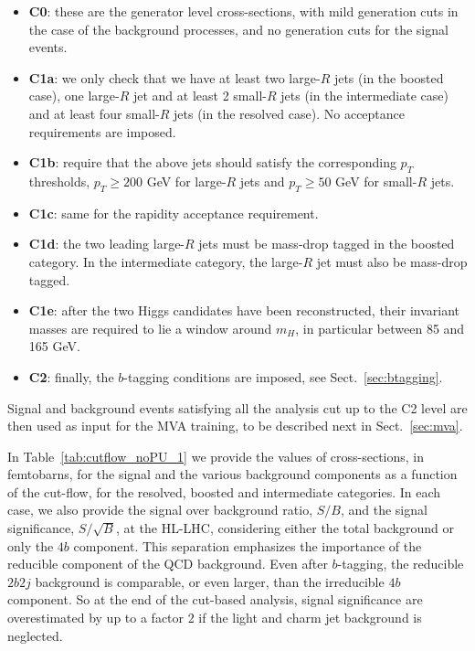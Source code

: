     \begin{itemize}
    \item {\bf C0}: these are the generator level cross-sections, with
      mild generation cuts in the case of the background processes, and no
      generation cuts
      for the signal events.
    \item {\bf C1a}:  we only check that we have at least
      two large-$R$ jets (in the boosted case),
      one large-$R$ jet and at least 2 small-$R$ jets (in the intermediate
      case) and at least four small-$R$ jets (in the resolved case).
      No acceptance requirements are imposed.
    \item {\bf C1b}: require that the above jets should
      satisfy the corresponding $p_T$ thresholds,
      $p_T \ge 200$ GeV for large-$R$ jets and
      $p_T \ge 50$ GeV for small-$R$ jets.
    \item {\bf C1c}: same for the
      rapidity acceptance requirement.
    \item {\bf C1d}: the two leading large-$R$ jets must
      be mass-drop tagged in the boosted category.
      In the intermediate category, the large-$R$ jet must also be mass-drop tagged.
    \item {\bf C1e}: after the two Higgs candidates  have been reconstructed,
      their invariant masses are required to lie a window around $m_H$,
      in particular between 85 and 165 GeV.
          \item {\bf C2}: finally, the
            $b$-tagging conditions are
            imposed, see
            Sect.~\ref{sec:btagging}.
      \end{itemize}
    Signal and background events satisfying all the analysis cut up to the
    C2 level
    are then used as input for the MVA training, to be described next
    in Sect.~\ref{sec:mva}.

    In Table~\ref{tab:cutflow_noPU_1} we provide
    the values of cross-sections, in femtobarns,
     for the signal
      and the various background
      components as a function of the
      cut-flow, for the resolved,
      boosted and intermediate
      categories.
       In each case, we also provide the signal over
      background ratio, $S/B$, and the signal
      significance, $S/\sqrt{B}$, at the HL-LHC, considering either
      the total background or only the $4b$ component.
      This separation emphasizes
      the  importance of the reducible component of the QCD background.
      Even after $b$-tagging, the reducible $2b2j$ background
      is comparable, or even larger, than the irreducible
      $4b$ component.
      So at the end of the cut-based analysis, signal significance
      are overestimated by up to a factor 2 if the light
      and charm jet background is neglected.


